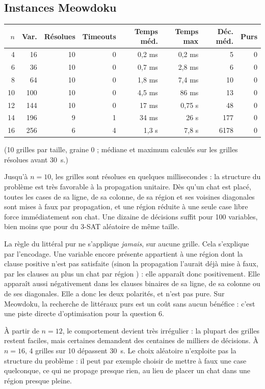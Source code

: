 \documentclass[11pt,a4paper]{article}
\begin{document}
\subsection{Instances Meowdoku}

\begin{center}
\begin{tabular}{rrrrrrrr}
  $n$ & Var. & Résolues & Timeouts & Temps méd. & Temps max & Déc. méd. & Purs \\
  \hline
  4  & 16  & 10 & 0 & 0,2 ms  & 0,2 ms & 5    & 0 \\
  6  & 36  & 10 & 0 & 0,7 ms  & 2,8 ms & 6    & 0 \\
  8  & 64  & 10 & 0 & 1,8 ms  & 7,4 ms & 10   & 0 \\
  10 & 100 & 10 & 0 & 4,5 ms  & 86 ms  & 13   & 0 \\
  12 & 144 & 10 & 0 & 17 ms   & 0,75 s & 48   & 0 \\
  14 & 196 & 9  & 1 & 34 ms   & 26 s   & 177  & 0 \\
  16 & 256 & 6  & 4 & 1,3 s   & 7,8 s  & 6178 & 0 \\
\end{tabular}
\end{center}
\noindent(10 grilles par taille, graine 0 ; médiane et maximum calculés sur
les grilles résolues avant 30~s.)

Jusqu'à $n=10$, les grilles sont résolues en quelques millisecondes : la
structure du problème est très favorable à la propagation unitaire. Dès
qu'un chat est placé, toutes les cases de sa ligne, de sa colonne, de sa
région et ses voisines diagonales sont mises à faux par propagation, et
une région réduite à une seule case libre force immédiatement son chat. Une
dizaine de décisions suffit pour 100 variables, bien moins que pour du 3-SAT
aléatoire de même taille.

La règle du littéral pur ne s'applique \emph{jamais}, sur aucune grille.
Cela s'explique par l'encodage. Une variable encore présente appartient à une
région dont la clause positive n'est pas satisfaite (sinon la propagation
l'aurait déjà mise à faux, par les clauses \og au plus un chat par région
\fg{}) : elle apparaît donc positivement. Elle apparaît aussi négativement
dans les clauses binaires de sa ligne, de sa colonne ou de ses diagonales.
Elle a donc les deux polarités, et n'est pas pure. Sur Meowdoku, la
recherche de littéraux purs est un coût sans aucun bénéfice : c'est une
piste directe d'optimisation pour la question 6.

À partir de $n=12$, le comportement devient très irrégulier : la plupart
des grilles restent faciles, mais certaines demandent des centaines de
milliers de décisions. À $n=16$, 4 grilles sur 10 dépassent 30~s. Le choix
aléatoire n'exploite pas la structure du problème : il peut par exemple
choisir de mettre à faux une case quelconque, ce qui ne propage presque
rien, au lieu de placer un chat dans une région presque pleine.
\end{document}
